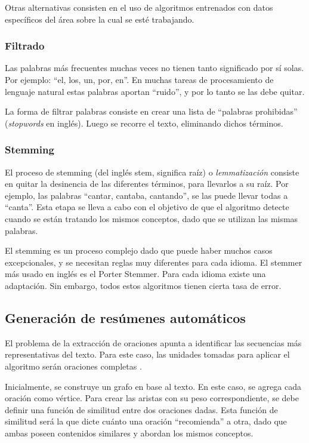 \documentclass[a4paper]{article}
\begin{document}
Otras alternativas consisten en el uso de algoritmos entrenados con datos específicos del área sobre la cual se esté trabajando.


\subsubsection{Filtrado}
Las palabras más frecuentes muchas veces no tienen tanto significado por sí solas. Por ejemplo: “el, los, un, por, en”. En muchas tareas de procesamiento de lenguaje natural estas palabras aportan “ruido”, y por lo tanto se las debe quitar. 

La forma de filtrar palabras consiste en crear una lista de “palabras prohibidas” (\textit{stopwords} en inglés). Luego se recorre el texto, eliminando dichos términos.


\subsubsection{Stemming}
El proceso de stemming (del inglés stem, significa raíz) o \textit{lemmatización} consiste en quitar la desinencia de las diferentes términos, para llevarlos a su raíz. Por ejemplo, las palabras “cantar, cantaba, cantando”, se las puede llevar todas a “canta”. Esta etapa se lleva a cabo con el objetivo de que el algoritmo detecte cuando se están tratando los mismos conceptos, dado que se utilizan las mismas palabras.

El stemming es un proceso complejo dado que puede haber muchos casos excepcionales, y se necesitan reglas muy diferentes para cada idioma. El stemmer más usado en inglés es el Porter Stemmer. Para cada idioma existe una adaptación. Sin embargo, todos estos algoritmos tienen cierta tasa de error.





\subsection{Generación de resúmenes automáticos}
El problema de la extracción de oraciones apunta a identificar las secuencias más representativas del texto. Para este caso, las unidades tomadas para aplicar el algoritmo serán oraciones completas \cite{introductionir}.

Inicialmente, se construye un grafo en base al texto. En este caso, se agrega cada oración como vértice. Para crear las aristas con su peso correspondiente, se debe definir una función de similitud entre dos oraciones dadas. Esta función de similitud será la que dicte cuánto una oración “recomienda” a otra, dado que ambas poseen contenidos similares y abordan los mismos conceptos.
    
\end{document}
